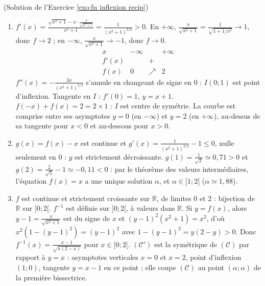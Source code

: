 \begin{corrige}
\begin{sol} ~ \\
(Solution de l'Exercice \ref{exo:fn inflexion recip})
\begin{enumerate}
\item $f'(x) = \frac{\sqrt{x^2+1} - x \cdot \frac{x}{\sqrt{x^2+1}}}{x^2+1} = \frac{1}{(x^2+1)^{3/2}} > 0$.
      En $+\infty$, $\frac{x}{\sqrt{x^2+1}} = \frac{1}{\sqrt{1 + 1/x^2}} \to 1$, donc $f \to 2$ ; en $-\infty$, $\frac{x}{\sqrt{x^2+1}} \to -1$, donc $f \to 0$.
      \[
      \begin{array}{c|ccc}
      x & -\infty & & +\infty \\ \hline
      f'(x) & & + & \\ \hline
      f(x) & 0 & \nearrow & 2
      \end{array}
      \]
      $f''(x) = -\frac{3x}{(x^2+1)^{5/2}}$ s'annule en changeant de signe en $0$ : $I(0;1)$ est point d'inflexion.
      Tangente en $I$ : $f'(0) = 1$, $\boxed{y = x + 1}$.
      $f(-x) + f(x) = 2 = 2 \times 1$ : $I$ est centre de sym\'etrie.
      La courbe est comprise entre ses asymptotes $y = 0$ (en $-\infty$) et $y = 2$ (en $+\infty$), au-dessus de sa tangente pour $x < 0$ et au-dessous pour $x > 0$.
\item $g(x) = f(x) - x$ est continue et $g'(x) = \frac{1}{(x^2+1)^{3/2}} - 1 \leq 0$, nulle seulement en $0$ : $g$ est strictement d\'ecroissante.
      $g(1) = \frac{1}{\sqrt{2}} \simeq 0{,}71 > 0$ et $g(2) = \frac{2}{\sqrt{5}} - 1 \simeq -0{,}11 < 0$ : par le th\'eor\`eme des valeurs interm\'ediaires,
      l'\'equation $f(x) = x$ a une unique solution $\alpha$, et $\alpha \in ]1;2[$ ($\alpha \simeq 1{,}88$).
\item $f$ est continue et strictement croissante sur $\mathbb{R}$, de limites $0$ et $2$ : bijection de $\mathbb{R}$ sur $]0;2[$.
      $f^{-1}$ est d\'efinie sur $]0;2[$, \`a valeurs dans $\mathbb{R}$.
      Si $y = f(x)$, alors $y - 1 = \frac{x}{\sqrt{x^2+1}}$ est du signe de $x$ et $(y-1)^2(x^2+1) = x^2$, d'o\`u $x^2\left(1 - (y-1)^2\right) = (y-1)^2$
      avec $1 - (y-1)^2 = y(2-y) > 0$. Donc $\boxed{f^{-1}(x) = \frac{x - 1}{\sqrt{x(2-x)}}}$ pour $x \in ]0;2[$.
      $(\mathscr{C}')$ est la sym\'etrique de $(\mathscr{C})$ par rapport \`a $y = x$ : asymptotes verticales $x = 0$ et $x = 2$, point d'inflexion $(1;0)$,
      tangente $y = x - 1$ en ce point ; elle coupe $(\mathscr{C})$ au point $(\alpha;\alpha)$ de la premi\`ere bissectrice.
\end{enumerate}
\end{sol}


\end{corrige}
